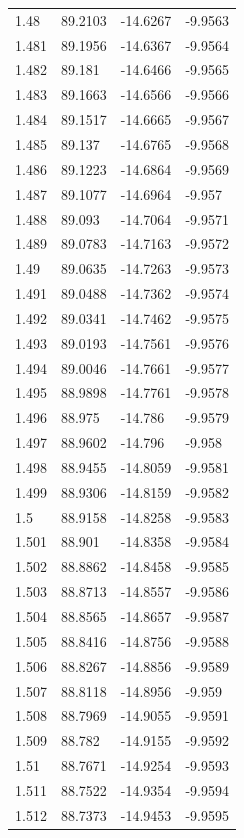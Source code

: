 \begin{tabular}{llll}
1.48 & 89.2103 & -14.6267 & -9.9563 \\
1.481 & 89.1956 & -14.6367 & -9.9564 \\
1.482 & 89.181 & -14.6466 & -9.9565 \\
1.483 & 89.1663 & -14.6566 & -9.9566 \\
1.484 & 89.1517 & -14.6665 & -9.9567 \\
1.485 & 89.137 & -14.6765 & -9.9568 \\
1.486 & 89.1223 & -14.6864 & -9.9569 \\
1.487 & 89.1077 & -14.6964 & -9.957 \\
1.488 & 89.093 & -14.7064 & -9.9571 \\
1.489 & 89.0783 & -14.7163 & -9.9572 \\
1.49 & 89.0635 & -14.7263 & -9.9573 \\
1.491 & 89.0488 & -14.7362 & -9.9574 \\
1.492 & 89.0341 & -14.7462 & -9.9575 \\
1.493 & 89.0193 & -14.7561 & -9.9576 \\
1.494 & 89.0046 & -14.7661 & -9.9577 \\
1.495 & 88.9898 & -14.7761 & -9.9578 \\
1.496 & 88.975 & -14.786 & -9.9579 \\
1.497 & 88.9602 & -14.796 & -9.958 \\
1.498 & 88.9455 & -14.8059 & -9.9581 \\
1.499 & 88.9306 & -14.8159 & -9.9582 \\
1.5 & 88.9158 & -14.8258 & -9.9583 \\
1.501 & 88.901 & -14.8358 & -9.9584 \\
1.502 & 88.8862 & -14.8458 & -9.9585 \\
1.503 & 88.8713 & -14.8557 & -9.9586 \\
1.504 & 88.8565 & -14.8657 & -9.9587 \\
1.505 & 88.8416 & -14.8756 & -9.9588 \\
1.506 & 88.8267 & -14.8856 & -9.9589 \\
1.507 & 88.8118 & -14.8956 & -9.959 \\
1.508 & 88.7969 & -14.9055 & -9.9591 \\
1.509 & 88.782 & -14.9155 & -9.9592 \\
1.51 & 88.7671 & -14.9254 & -9.9593 \\
1.511 & 88.7522 & -14.9354 & -9.9594 \\
1.512 & 88.7373 & -14.9453 & -9.9595 \\

\end{tabular}
